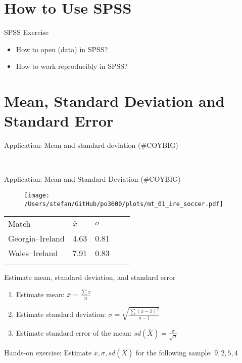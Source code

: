 \documentclass[10pt]{beamer}
\begin{document}
\section{How to Use SPSS}
\begin{frame}{SPSS Exercise}
\begin{itemize}
\item How to open (data) in SPSS?
\item How to work reproducibly in SPSS?
\end{itemize}
\end{frame}


\section{Mean, Standard Deviation and Standard Error}

\begin{frame}{Application: Mean and standard deviation (\#COYBIG)}

\begin{figure} \centering
{} \\ \vspace{.5cm}
\end{figure}
\end{frame}

\begin{frame}{Application: Mean and Standard Deviation (\#COYBIG)}

\begin{figure} \centering
\texttt{[image: /Users/stefan/GitHub/po3600/plots/mt\_01\_ire\_soccer.pdf]}
\end{figure}

\begin{table}[]
\centering \footnotesize
\begin{tabular}{lllll}
Match & $\bar{x}$ & $\sigma$ &  &  \\
Georgia--Ireland & 4.63 & 0.81 &  &  \\
Wales--Ireland & 7.91 & 0.83 &  &  \\
 &  &  &  & 
\end{tabular}
\end{table}
\end{frame}

\begin{frame}{Estimate  mean, standard deviation, and standard error}
\begin{enumerate}
\item Estimate mean: $\bar{x}=\frac{\sum{x}}{n}$
\item Estimate standard deviation: $\sigma=\sqrt{\frac{\sum(x-\bar{x})^{2}}{n-1}}$
\item Estimate standard error of the mean: $sd(\bar{X})=\frac{\sigma}{\sqrt{n}}$
\end{enumerate}
Hands-on exercise: Estimate $\bar{x},\sigma, sd(\bar{X})$ for the following sample:
$9, 2, 5, 4$
\end{frame}
\end{document}
